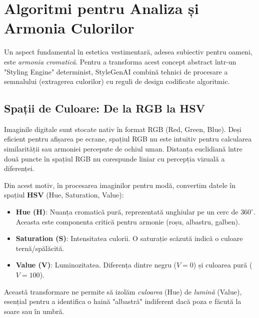 \section{Algoritmi pentru Analiza și Armonia Culorilor}

Un aspect fundamental în estetica vestimentară, adesea subiectiv pentru oameni, este \textit{armonia cromatică}. Pentru a transforma acest concept abstract într-un "Styling Engine" determinist, StyleGenAI combină tehnici de procesare a semnalului (extragerea culorilor) cu reguli de design codificate algoritmic.

\subsection{Spații de Culoare: De la RGB la HSV}
Imaginile digitale sunt stocate nativ în format RGB (Red, Green, Blue). Deși eficient pentru afișarea pe ecrane, spațiul RGB nu este intuitiv pentru calcularea similarității sau armoniei percepute de ochiul uman. Distanța euclidiană între două puncte în spațiul RGB nu corespunde liniar cu percepția vizuală a diferenței.

Din acest motiv, în procesarea imaginilor pentru modă, convertim datele în spațiul \textbf{HSV} (Hue, Saturation, Value):
\begin{itemize}
    \item \textbf{Hue (H)}: Nuanța cromatică pură, reprezentată unghiular pe un cerc de $360^{\circ}$. Aceasta este componenta critică pentru armonie (roșu, albastru, galben).
    \item \textbf{Saturation (S)}: Intensitatea culorii. O saturație scăzută indică o culoare ternă/spălăcită.
    \item \textbf{Value (V)}: Luminozitatea. Diferența dintre negru ($V=0$) și culoarea pură ($V=100$).
\end{itemize}

Această transformare ne permite să izolăm \textit{culoarea} (Hue) de \textit{lumină} (Value), esențial pentru a identifica o haină "albastră" indiferent dacă poza e făcută la soare sau în umbră.

